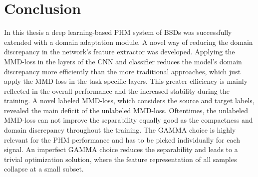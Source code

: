 \chapter{Conclusion}\label{chapter:conclusion}
In this thesis a deep learning-based PHM system of BSDs was successfully extended with a domain adaptation module. A novel way of reducing the domain discrepancy in the network's feature extractor was developed. Applying the MMD-loss in the layers of the CNN and classifier reduces the model's domain discrepancy more efficiently than the more traditional approaches, which just apply the MMD-loss in the task specific layers. This greater efficiency is mainly reflected in the overall performance and the increased stability during the training. A novel labeled MMD-loss, which considers the source and target labels, revealed the main deficit of the unlabeled MMD-loss. Oftentimes, the unlabeled MMD-loss can not improve the separability equally good as the compactness and domain discrepancy throughout the training. The GAMMA choice is highly relevant for the PHM performance and has to be picked individually for each signal. An imperfect GAMMA choice reduces the separability and leads to a trivial optimization solution, where the feature representation of all samples collapse at a small subset. 
